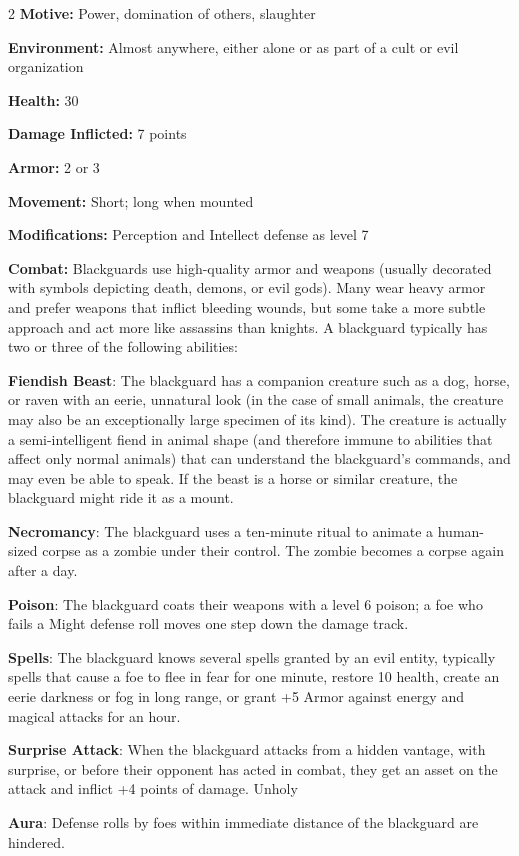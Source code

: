 \begin{multicols}{2}
\textbf{Motive:} Power, domination of others, slaughter 

\textbf{Environment:} Almost anywhere, either alone or as part of a cult or evil organization 

\textbf{Health:} 30 

\textbf{Damage Inflicted:} 7 points 

\textbf{Armor:} 2 or 3 

\textbf{Movement:} Short; long when mounted 

\textbf{Modifications:} Perception and Intellect defense as level 7 

\textbf{Combat:} Blackguards use high-quality armor and weapons (usually decorated with symbols depicting death, demons, or evil gods). Many wear heavy armor and prefer weapons that inflict bleeding wounds, but some take a more subtle approach and act more like assassins than knights. A blackguard typically has two or three of the following abilities: 

\textbf{Fiendish Beast}: The blackguard has a companion creature such as a dog, horse, or raven with an eerie, unnatural look (in the case of small animals, the creature may also be an exceptionally large specimen of its kind). The creature is actually a semi-intelligent fiend in animal shape (and therefore immune to abilities that affect only normal animals) that can understand the blackguard’s commands, and may even be able to speak. If the beast is a horse or similar creature, the blackguard might ride it as a mount. 

\textbf{Necromancy}: The blackguard uses a ten-minute ritual to animate a human-sized corpse as a zombie under their control. The zombie becomes a corpse again after a day. 

\textbf{Poison}: The blackguard coats their weapons with a level 6 poison; a foe who fails a Might defense roll moves one step down the damage track. 

\textbf{Spells}: The blackguard knows several spells granted by an evil entity, typically spells that cause a foe to flee in fear for one minute, restore 10 health, create an eerie darkness or fog in long range, or grant +5 Armor against energy and magical attacks for an hour. 

\textbf{Surprise Attack}: When the blackguard attacks from a hidden vantage, with surprise, or before their opponent has acted in combat, they get an asset on the attack and inflict +4 points of damage. Unholy 

\textbf{Aura}: Defense rolls by foes within immediate distance of the blackguard are hindered. 


\end{multicols}
